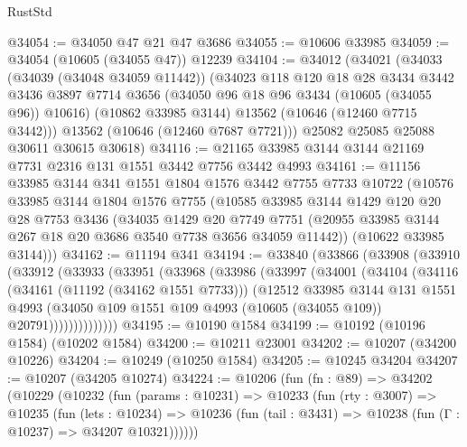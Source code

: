 \begin{lexlean}{RustStd}
\begin{coremodule}
@34054 := @34050 @47 @21 @47 @3686
@34055 := @10606 @33985
@34059 := @34054 (@10605 (@34055 @47)) @12239
@34104 := @34012
    (@34021
      (@34033
        (@34039 (@34048 @34059 @11442))
        (@34023
          @118
          @120
          @18
          @28
          @3434
          @3442
          @3436
          @3897
          @7714
          @3656
          (@34050 @96 @18 @96 @3434 (@10605 (@34055 @96)) @10616)
          (@10862 @33985 @3144)
          @13562
          (@10646 (@12460 @7715 @3442)))
        @13562
        (@10646 (@12460 @7687 @7721)))
      @25082
      @25085
      @25088
      @30611
      @30615
      @30618)
@34116 := @21165 @33985 @3144 @3144 @21169 @7731 @2316 @131 @1551 @3442 @7756 @3442 @4993
@34161 := @11156
    @33985
    @3144
    @341
    @1551
    @1804
    @1576
    @3442
    @7755
    @7733
    @10722
    (@10576
      @33985
      @3144
      @1804
      @1576
      @7755
      (@10585
        @33985
        @3144
        @1429
        @120
        @20
        @28
        @7753
        @3436
        (@34035
          @1429
          @20
          @7749
          @7751
          (@20955 @33985 @3144 @267 @18 @20 @3686 @3540 @7738 @3656 @34059 @11442))
        (@10622 @33985 @3144)))
@34162 := @11194 @341
@34194 := @33840
    (@33866
      (@33908
        (@33910
          (@33912
            (@33933
              (@33951
                (@33968
                  (@33986
                    (@33997
                      (@34001
                        (@34104
                          (@34116
                            (@34161 (@11192 (@34162 @1551 @7733)))
                            (@12512
                              @33985
                              @3144
                              @131
                              @1551
                              @4993
                              (@34050
                                @109
                                @1551
                                @109
                                @4993
                                (@10605 (@34055 @109))
                                @20791))))))))))))))
@34195 := @10190 @1584
@34199 := @10192 (@10196 @1584) (@10202 @1584)
@34200 := @10211 @23001
@34202 := @10207 (@34200 @10226)
@34204 := @10249 (@10250 @1584)
@34205 := @10245 @34204
@34207 := @10207 (@34205 @10274)
@34224 := @10206
    (fun (fn : @89) =>
    @34202
      (@10229
        (@10232
          (fun (params : @10231) =>
          @10233
            (fun (rty : @3007) =>
            @10235
              (fun (lets : @10234) =>
              @10236 (fun (tail : @3431) => @10238 (fun (Γ : @10237) => @34207 @10321))))))

\end{coremodule}
\end{lexlean}
